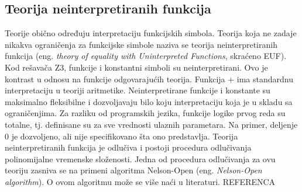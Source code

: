 \documentclass[12pt,oneside]{memoir}
\begin{document}
\subsection{Teorija neinterpretiranih funkcija}
Teorije obično određuju interpretaciju funkcijskih simbola. Teorija koja ne zadaje nikakva ograničenja za funkcijske simbole naziva se teorija neinterpretiranih funkcija 
(eng. \textit{theory of equality with Uninterpreted Functions}, skraćeno EUF). Kod rešavača Z3, funkcije i konstantni simboli su neinterpretirani. Ovo je kontrast u odnosu na funkcije odgovarajućih teorija. Funkcija + ima standardnu interpretaciju u teoriji aritmetike. Neinterpretirane funkcije i konstante su maksimalno fleksibilne i dozvoljavaju bilo koju interpretaciju koja je u skladu sa ograničenjima. Za razliku od programskih jezika, funkcije logike prvog reda su totalne, tj. definisane su za sve vrednosti ulaznih parametara. Na primer, deljenje 0 je dozvoljeno, ali nije specifikovano šta ono predstavlja. Teorija neinterpretiranih funkcija je odlučiva i postoji procedura odlučivanja polinomijalne vremenske složenosti. Jedna od procedura odlučivanja za ovu teoriju zasniva se na primeni algoritma Nelson-Open (eng. \textit{Nelson-Open algorithm}). O ovom algoritmu može se više naći u literaturi. REFERENCA
\par
\end{document}
